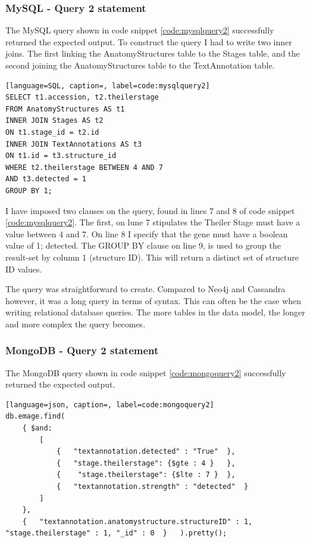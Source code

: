 \subsubsection*{MySQL - Query 2 statement}\label{mysqlquery2statement}
The MySQL query shown in code snippet \ref{code:mysqlquery2} successfully returned the expected output. To construct the query I had to write two inner joins. The first linking the AnatomyStructures table to the Stages table, and the second joining the AnatomyStructures table to the TextAnnotation table.

\begin{lstlisting}[language=SQL, caption=, label=code:mysqlquery2]
SELECT t1.accession, t2.theilerstage
FROM AnatomyStructures AS t1
INNER JOIN Stages AS t2
ON t1.stage_id = t2.id
INNER JOIN TextAnnotations AS t3
ON t1.id = t3.structure_id
WHERE t2.theilerstage BETWEEN 4 AND 7
AND t3.detected = 1
GROUP BY 1;
\end{lstlisting}

I have imposed two clauses on the query, found in lines 7 and 8 of code snippet \ref{code:mysqlquery2}. The first, on lune 7 stipulates the Theiler Stage must have a value between 4 and 7. On line 8 I specify that the gene must have a boolean value of 1; detected. The GROUP BY clause on line 9, is used to group the result-set by column 1 (structure ID). This will return a distinct set of structure ID values.

The query was straightforward to create. Compared to Neo4j and Cassandra however, it was a long query in terms of syntax. This can often be the case when writing relational database queries. The more tables in the data model, the longer and more complex the query becomes.

\subsubsection*{MongoDB - Query 2 statement}\label{mongoquery2statement}
The MongoDB query shown in code snippet \ref{code:mongoquery2} successfully returned the expected output.

\parindent 0pt
\begin{lstlisting}[language=json, caption=, label=code:mongoquery2]
db.emage.find(
	{ $and:
		[
			{	"textannotation.detected" : "True"	},
			{	"stage.theilerstage": {$gte : 4 }	},
			{	 "stage.theilerstage": {$lte : 7 }	},
			{	"textannotation.strength" : "detected"	}
		]
	},
	{	"textannotation.anatomystructure.structureID" : 1, "stage.theilerstage" : 1, "_id" : 0	}	).pretty();
\end{lstlisting}

